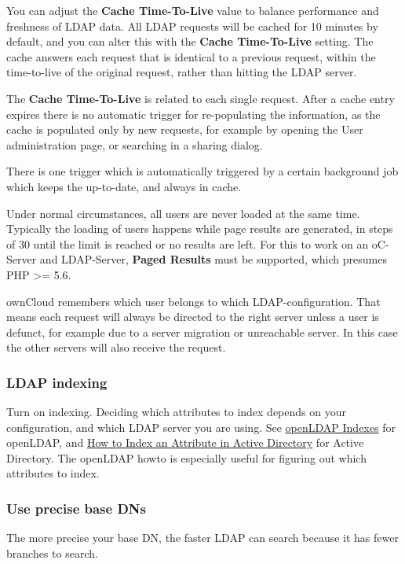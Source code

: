 \documentclass[letterpaper,10pt,english]{sphinxmanual}
\begin{document}
You can adjust the \textbf{Cache Time-To-Live} value to balance performance and
freshness of LDAP data. All LDAP requests will be cached for 10 minutes by
default, and you can alter this with the \textbf{Cache Time-To-Live} setting. The
cache answers each request that is identical to a previous request, within the
time-to-live of the original request, rather than hitting the LDAP server.

The \textbf{Cache Time-To-Live} is related to each single request. After a cache
entry expires there is no automatic trigger for re-populating the information,
as the cache is populated only by new requests, for example by opening the
User administration page, or searching in a sharing dialog.

There is one trigger which is automatically triggered by a certain background
job which keeps the  up-to-date, and always in cache.

Under normal circumstances, all users are never loaded at the same time.
Typically the loading of users happens while page results are generated, in
steps of 30 until the limit is reached or no results are left. For this to
work on an oC-Server and LDAP-Server, \textbf{Paged Results} must be supported,
which presumes PHP \textgreater{}= 5.6.

ownCloud remembers which user belongs to which LDAP-configuration. That means
each request will always be directed to the right server unless a user is
defunct, for example due to a server migration or unreachable server. In this
case the other servers will also receive the request.


\subsubsection{LDAP indexing}
\label{configuration_user/user_auth_ldap:ldap-indexing}
Turn on indexing. Deciding which attributes to index depends on your configuration, and which LDAP server you are using. See \href{http://www.openldap.org/doc/admin24/tuning.html\#Indexes}{openLDAP Indexes} for openLDAP, and \href{https://technet.microsoft.com/en-us/library/aa995762(v=exchg.65).aspx}{How to Index an Attribute in Active Directory} for Active Directory. The openLDAP howto is especially useful for figuring out which attributes to index.


\subsubsection{Use precise base DNs}
\label{configuration_user/user_auth_ldap:use-precise-base-dns}
The more precise your base DN, the faster LDAP can search because it has fewer branches to search.
\end{document}
